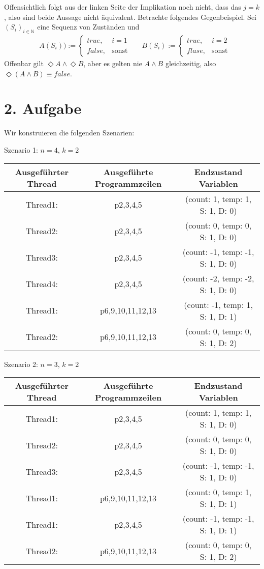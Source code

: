 \documentclass[numbers=noendperiod]{scrartcl}
\begin{document}
\begin{enumerate}
		Offensichtlich folgt aus der linken Seite der Implikation noch nicht, dass das $j = k$, also sind beide Aussage nicht äquivalent. Betrachte folgendes Gegenbeispiel. Sei $(S_i)_{i\in \mathbb{N}}$ eine Sequenz von Zuständen und
		\begin{align}
			&A(S_i) ) := \begin{cases}
			true, &i=1\\
			false, &\text{sonst}
			\end{cases}
			&& B(S_i) := \begin{cases}
			true, &i=2\\
			flase, &\text{sonst}
			\end{cases}
		\end{align}
		Offenbar gilt $\Diamond A \land \Diamond B$, aber es gelten nie $A \land B$ gleichzeitig, also $\Diamond (A\land B) \equiv false$.
		
	\end{enumerate}


\section*{2. Aufgabe}
	Wir konstruieren die folgenden Szenarien:
	
	Szenario 1: $n=4$, $k=2$\\
	\begin{tabular}{|c|c|c|}
		Ausgeführter Thread & Ausgeführte Programmzeilen & Endzustand Variablen\\\hline
		Thread1:& p2,3,4,5& (count: 1, temp: 1, S: 1, D: 0)\\
		Thread2:& p2,3,4,5& (count: 0, temp: 0, S: 1, D: 0)\\
		Thread3:& p2,3,4,5& (count: -1, temp: -1, S: 1, D: 0)\\
		Thread4:& p2,3,4,5& (count: -2, temp: -2, S: 1, D: 0)\\
		Thread1:& p6,9,10,11,12,13& (count: -1, temp: 1, S: 1, D: 1)\\
		Thread2:& p6,9,10,11,12,13& (count: 0, temp: 0, S: 1, D: 2)\\
	\end{tabular}
	
	Szenario 2: $n=3$, $k=2$\\
	\begin{tabular}{|c|c|c|}
		Ausgeführter Thread & Ausgeführte Programmzeilen & Endzustand Variablen\\\hline
		Thread1:& p2,3,4,5& (count: 1, temp: 1, S: 1, D: 0)\\
		Thread2:& p2,3,4,5& (count: 0, temp: 0, S: 1, D: 0)\\
		Thread3:& p2,3,4,5& (count: -1, temp: -1, S: 1, D: 0)\\
		Thread1:& p6,9,10,11,12,13& (count: 0, temp: 1, S: 1, D: 1)\\
		Thread1:& p2,3,4,5& (count: -1, temp: -1, S: 1, D: 1)\\
		Thread2:& p6,9,10,11,12,13& (count: 0, temp: 0, S: 1, D: 2)\\
	\end{tabular}\\
\end{document}
